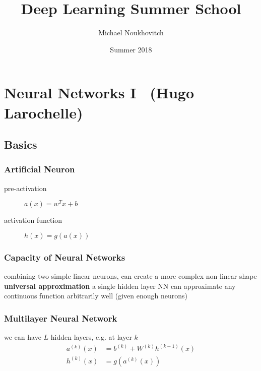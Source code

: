 \documentclass[]{article}
\theoremstyle{definition}
\begin{document}
    \let\ref\Cref

    \title{\bf{Deep Learning Summer School}}
    \date{Summer 2018}
    \author{Michael Noukhovitch}

    \maketitle
    \newpage
    \tableofcontents
    \newpage

    \section{Neural Networks I \ {\small (Hugo Larochelle)}}%
    \label{sec:neural_networks_i}

    \subsection{Basics}%
    \label{sub:basics}

    \subsubsection{Artificial Neuron}%
    \label{ssub:artificial_neuron}
    \begin{description}
        \item[pre-activation] $a(x) = w^T x + b$
        \item[activation function] $h(x) = g(a(x))$
    \end{description}

    \subsubsection{Capacity of Neural Networks}%
    \label{ssub:capacity_of_neural_networks}

    combining two simple linear neurons, can create a more complex non-linear shape \\

    \textbf{universal approximation} a single hidden layer NN can approximate any continuous function arbitrarily well (given enough neurons)

    \subsubsection{Multilayer Neural Network}%
    \label{ssub:multilayer_neural_network}

    we can have $L$ hidden layers, e.g. at layer $k$
    \begin{align*}
        a^{(k)} (x) &= b^{(k)} + W^{(k)}h^{(k-1)} (x) \\
        h^{(k)} (x) &= g(a^{(k)}(x))
    \end{align*}
\end{document}
